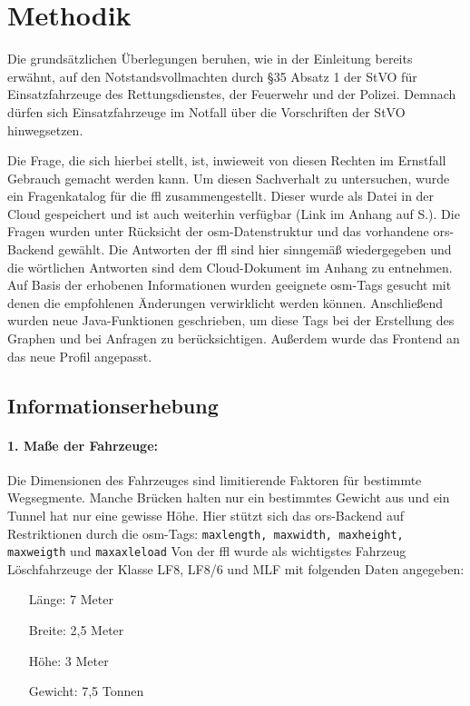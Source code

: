 \section{Methodik}
Die grundsätzlichen Überlegungen beruhen, wie in der Einleitung bereits erwähnt, auf den Notstandsvollmachten durch §35 Absatz 1 der StVO für Einsatzfahrzeuge des Rettungsdienstes, der Feuerwehr und der Polizei.
Demnach dürfen sich Einsatzfahrzeuge im Notfall über die Vorschriften der StVO hinwegsetzen.

Die Frage, die sich hierbei stellt, ist, inwieweit von diesen Rechten im Ernstfall Gebrauch gemacht werden kann.
Um diesen Sachverhalt zu untersuchen, wurde ein Fragenkatalog für die \gls{ffl} zusammengestellt.
Dieser wurde als Datei in der Cloud gespeichert und ist auch weiterhin verfügbar (Link im Anhang auf S.\pageref{sec:anhang}).
Die Fragen wurden unter Rücksicht der \gls{osm}-Datenstruktur und das vorhandene \gls{ors}-Backend gewählt.
Die Antworten der \gls{ffl} sind hier sinngemäß wiedergegeben und die wörtlichen Antworten sind dem Cloud-Dokument im Anhang zu entnehmen.
Auf Basis der erhobenen Informationen wurden geeignete \gls{osm}-Tags gesucht mit denen die empfohlenen Änderungen verwirklicht werden können.
Anschließend wurden neue Java-Funktionen geschrieben, um diese Tags bei der Erstellung des Graphen und bei Anfragen zu berücksichtigen.
Außerdem wurde das Frontend an das neue Profil angepasst.

\subsection{Informationserhebung}

\paragraph*{1. Maße der Fahrzeuge:}
\label{frage1}
\par
Die Dimensionen des Fahrzeuges sind limitierende Faktoren für bestimmte Wegsegmente.
Manche Brücken halten nur ein bestimmtes Gewicht aus und ein Tunnel hat nur eine gewisse Höhe.
Hier stützt sich das \gls{ors}-Backend auf Restriktionen durch die \gls{osm}-Tags: \texttt{maxlength, maxwidth, maxheight, maxweigth} und \texttt{maxaxleload} Von der \gls{ffl} wurde als wichtigstes Fahrzeug Löschfahrzeuge der Klasse LF8, LF8/6 und MLF mit folgenden Daten angegeben:
\begin{itemize}
\centering
\item[Länge:] 7 Meter
\item[Breite:] 2,5 Meter
\item[Höhe:] 3 Meter
\item[Gewicht:] 7,5 Tonnen
\end{itemize}

